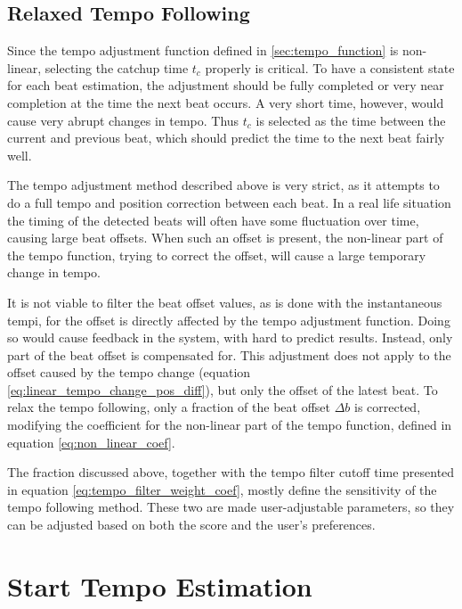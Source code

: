 \subsection{Relaxed Tempo Following}

Since the tempo adjustment function defined in
\ref{sec:tempo_function} is non-linear,
selecting the catchup time $t_c$ properly is critical.
To have a consistent state for each beat estimation,
the adjustment should be fully completed
or very near completion
at the time the next beat occurs.
A very short time, however,
would cause very abrupt changes in tempo.
Thus $t_c$ is selected as the time between
the current and previous beat,
which should predict the time to the next
beat fairly well.

The tempo adjustment method described above is very strict,
as it attempts to do a full tempo and position correction
between each beat.
In a real life situation
the timing of the detected beats will often have some
fluctuation over time,
causing large beat offsets.
When such an offset is present,
the non-linear part of the tempo function,
trying to correct the offset,
will cause a large temporary change in tempo.

It is not viable to filter the beat offset values,
as is done with the instantaneous tempi,
for the offset is directly affected by
the tempo adjustment function.
Doing so would cause feedback in the system,
with hard to predict results.
Instead, only part of the beat offset is compensated for.
This adjustment does not apply to
the offset caused by the tempo change
(equation \ref{eq:linear_tempo_change_pos_diff}),
but only the offset of the latest beat.
To relax the tempo following,
only a fraction of the beat offset $\Delta b$ is corrected,
modifying the coefficient for the non-linear 
part of the tempo function, defined in equation
\ref{eq:non_linear_coef}.

The fraction discussed above,
together with the tempo filter cutoff time
presented in equation \ref{eq:tempo_filter_weight_coef},
mostly define the sensitivity of the tempo following method.
These two are made user-adjustable parameters,
so they can be adjusted based on both the score
and the user's preferences.

\section{Start Tempo Estimation}
\label{sec:meth:start_tempo_estimation}

